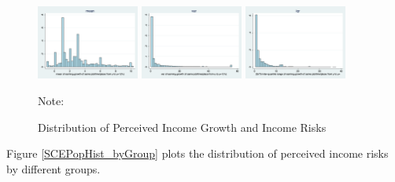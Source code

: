 \documentclass[]{article}
\begin{document}
\begin{figure}[ht]
	
	\centering
	\caption{Distribution of Perceived Income Growth and Income Risks}
	\label{SCEPopHist}
	\includegraphics[width=0.3\textwidth]{figures/hist_mean.png}
	\includegraphics[width=0.3\textwidth]{figures/hist_var.png}
	\includegraphics[width=0.3\textwidth]{figures/hist_iqr.png}
	\begin{flushleft}
		{\footnotesize Note: }
	\end{flushleft}
	
\end{figure}

Figure \ref{SCEPopHist_byGroup} plots the distribution of perceived income risks by different groups. 
\end{document}
